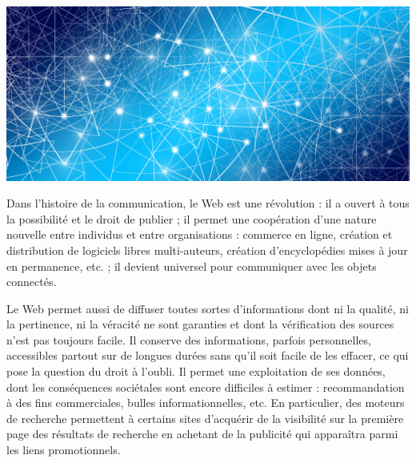 \begin{jazzgraphic*}
\includegraphics[width=\linewidth]{./Images/Chapter09/network-gerd-altmann-pixabay.jpg}%
%
\end{jazzgraphic*}

\begin{tcolorbox}[title={Impacts sur les pratiques humaines}, toprule=0pt, leftrule=0pt, rightrule=0pt, arc=0pt,
                  fonttitle=\scshape\boxtitlefont,
                  colbacktitle=white, coltitle=firstcolor, colframe=firstcolor, colback=firstcolor!10,
                  breakable, enhanced jigsaw]
Dans l’histoire de la communication, le Web est une révolution : il a ouvert à tous la possibilité et le droit de publier ; il permet une coopération d’une nature nouvelle entre individus et entre organisations : commerce en ligne, création et distribution de logiciels libres multi-auteurs, création d’encyclopédies mises à jour en permanence, etc. ; il devient universel pour communiquer avec les objets connectés.

Le Web permet aussi de diffuser toutes sortes d’informations dont ni la qualité, ni la pertinence, ni la véracité ne sont garanties et dont la vérification des sources n’est pas toujours facile. Il conserve des informations, parfois personnelles, accessibles partout sur de longues durées sans qu’il soit facile de les effacer, ce qui pose la question du droit à l’oubli. Il permet une exploitation de ses données, dont les conséquences sociétales sont encore difficiles à estimer : recommandation à des fins commerciales, bulles informationnelles, etc. En particulier, des moteurs de recherche permettent à certains sites d’acquérir de la visibilité sur la première page des résultats de recherche en achetant de la publicité qui apparaîtra parmi les liens promotionnels. 
\end{tcolorbox}

